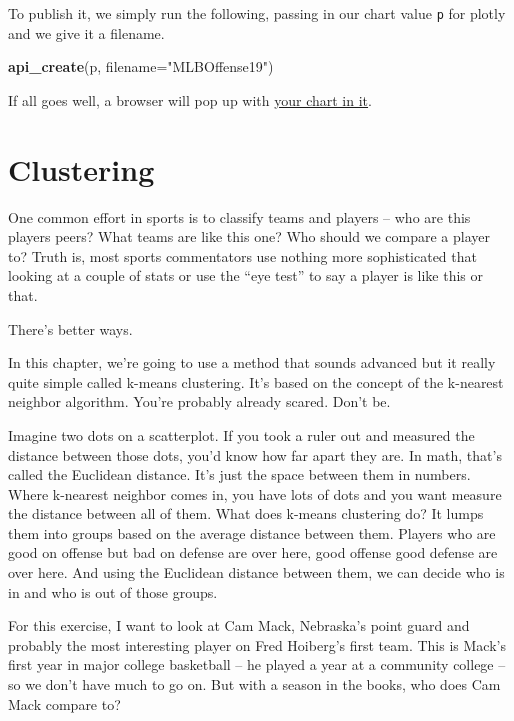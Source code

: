 \documentclass[
]{book}
\newenvironment{Shaded}{\begin{snugshade}}{\end{snugshade}}
\newcommand{\DataTypeTok}[1]{\textcolor[rgb]{0.13,0.29,0.53}{#1}}
\newcommand{\KeywordTok}[1]{\textcolor[rgb]{0.13,0.29,0.53}{\textbf{#1}}}
\newcommand{\NormalTok}[1]{#1}
\newcommand{\StringTok}[1]{\textcolor[rgb]{0.31,0.60,0.02}{#1}}
\begin{document}
To publish it, we simply run the following, passing in our chart value \texttt{p} for plotly and we give it a filename.

\begin{Shaded}
\begin{Highlighting}[]
\KeywordTok{api_create}\NormalTok{(p, }\DataTypeTok{filename=}\StringTok{"MLBOffense19"}\NormalTok{)}
\end{Highlighting}
\end{Shaded}

If all goes well, a browser will pop up with \href{https://plot.ly/~mattwaite/1/\#/}{your chart in it}.

\hypertarget{clustering}{%
\chapter{Clustering}\label{clustering}}

One common effort in sports is to classify teams and players -- who are this players peers? What teams are like this one? Who should we compare a player to? Truth is, most sports commentators use nothing more sophisticated that looking at a couple of stats or use the ``eye test'' to say a player is like this or that.

There's better ways.

In this chapter, we're going to use a method that sounds advanced but it really quite simple called k-means clustering. It's based on the concept of the k-nearest neighbor algorithm. You're probably already scared. Don't be.

Imagine two dots on a scatterplot. If you took a ruler out and measured the distance between those dots, you'd know how far apart they are. In math, that's called the Euclidean distance. It's just the space between them in numbers. Where k-nearest neighbor comes in, you have lots of dots and you want measure the distance between all of them. What does k-means clustering do? It lumps them into groups based on the average distance between them. Players who are good on offense but bad on defense are over here, good offense good defense are over here. And using the Euclidean distance between them, we can decide who is in and who is out of those groups.

For this exercise, I want to look at Cam Mack, Nebraska's point guard and probably the most interesting player on Fred Hoiberg's first team. This is Mack's first year in major college basketball -- he played a year at a community college -- so we don't have much to go on. But with a season in the books, who does Cam Mack compare to?
\end{document}
